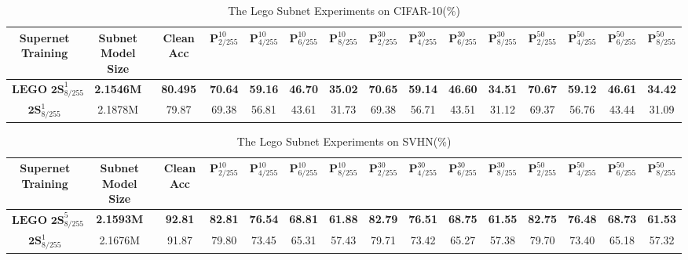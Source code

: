 \documentclass[journal]{IEEEtran}
\begin{document}
\begin{table*}[ht]
    \centering
    \setlength{\tabcolsep}{0.8mm}
    \caption{The Lego Subnet Experiments on CIFAR-10(\%)}
    \begin{tabular}{c|c|c|cccccccccccc}
    Supernet Training& Subnet Model Size & Clean Acc & $\textbf{P}_{2/255}^{10}$ & $\textbf{P}_{4/255}^{10}$ & $\textbf{P}_{6/255}^{10}$ & $\textbf{P}_{8/255}^{10}$ & $\textbf{P}_{2/255}^{30}$ & $\textbf{P}_{4/255}^{30}$ & $\textbf{P}_{6/255}^{30}$ & $\textbf{P}_{8/255}^{30}$ & $\textbf{P}_{2/255}^{50}$ & $\textbf{P}_{4/255}^{50}$ & $\textbf{P}_{6/255}^{50}$ & $\textbf{P}_{8/255}^{50}$\\
    \hline
    $\textbf{LEGO 2S}_{8/255}^{1}$ & \textbf{2.1546M} & \textbf{80.495} & \textbf{70.64} & \textbf{59.16} & \textbf{46.70} & \textbf{35.02} & \textbf{70.65} & \textbf{59.14} & \textbf{46.60} & \textbf{34.51} & \textbf{70.67} & \textbf{59.12} & \textbf{46.61} & \textbf{34.42} \\
    \hline
    $\textbf{2S}_{8/255}^{1}$ & 2.1878M & 79.87 & 69.38 & 56.81 & 43.61 & 31.73 & 69.38 & 56.71 & 43.51 & 31.12 & 69.37 & 56.76 & 43.44 & 31.09 \\ 
    \hline
    \end{tabular}\label{tab:lego_cifar10}
\end{table*}

\begin{table*}[ht]
    \centering
    \setlength{\tabcolsep}{0.8mm}
    \caption{The Lego Subnet Experiments on SVHN(\%)}
    \begin{tabular}{c|c|c|cccccccccccc}
    Supernet Training& Subnet Model Size & Clean Acc & $\textbf{P}_{2/255}^{10}$ & $\textbf{P}_{4/255}^{10}$ & $\textbf{P}_{6/255}^{10}$ & $\textbf{P}_{8/255}^{10}$ & $\textbf{P}_{2/255}^{30}$ & $\textbf{P}_{4/255}^{30}$ & $\textbf{P}_{6/255}^{30}$ & $\textbf{P}_{8/255}^{30}$ & $\textbf{P}_{2/255}^{50}$ & $\textbf{P}_{4/255}^{50}$ & $\textbf{P}_{6/255}^{50}$ & $\textbf{P}_{8/255}^{50}$\\
    \hline
    $\textbf{LEGO 2S}_{8/255}^{5}$ & \textbf{2.1593M} & \textbf{92.81} & \textbf{82.81} & \textbf{76.54} & \textbf{68.81} & \textbf{61.88} & \textbf{82.79} & \textbf{76.51} & \textbf{68.75}& \textbf{61.55} & \textbf{82.75} & \textbf{76.48} & \textbf{68.73} & \textbf{61.53} \\
    \hline
    $\textbf{2S}_{8/255}^{1}$ & 2.1676M & 91.87 & 79.80 & 73.45 & 65.31 & 57.43 & 79.71 & 73.42 & 65.27 & 57.38 & 79.70 & 73.40 & 65.18 & 57.32 \\ 
    \hline
    \end{tabular}\label{tab:lego_svhn}
\end{table*}
\end{document}
